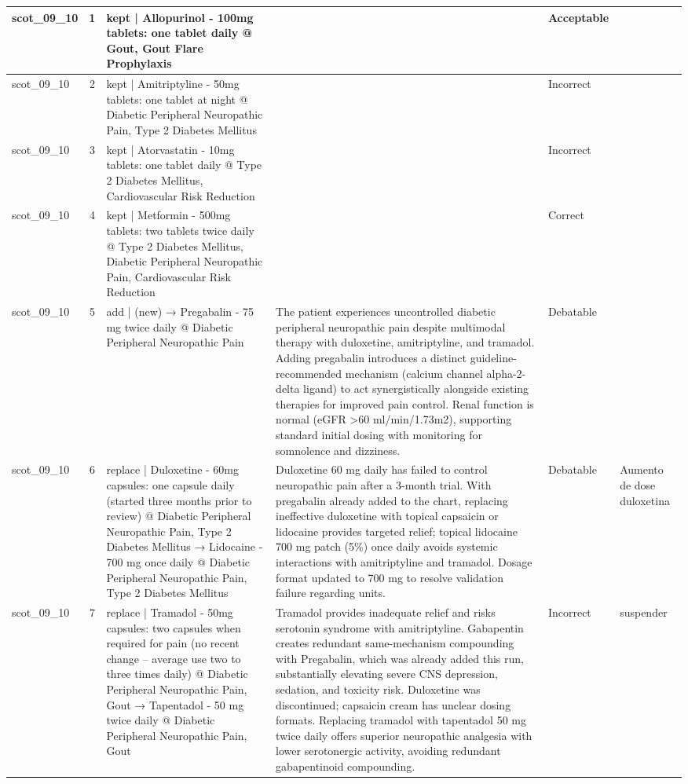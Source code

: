 \begin{longtable}{|p{1.45cm}|c|p{3.3cm}|p{6.5cm}|p{1.55cm}|p{2.3cm}|}
\hline
scot\_09\_10 & 1 & kept | Allopurinol - 100mg tablets: one tablet daily @ Gout, Gout Flare Prophylaxis &  & Acceptable &  \\
\hline
scot\_09\_10 & 2 & kept | Amitriptyline - 50mg tablets: one tablet at night @ Diabetic Peripheral Neuropathic Pain, Type 2 Diabetes Mellitus &  & Incorrect &  \\
\hline
scot\_09\_10 & 3 & kept | Atorvastatin - 10mg tablets: one tablet daily @ Type 2 Diabetes Mellitus, Cardiovascular Risk Reduction &  & Incorrect &  \\
\hline
scot\_09\_10 & 4 & kept | Metformin - 500mg tablets: two tablets twice daily @ Type 2 Diabetes Mellitus, Diabetic Peripheral Neuropathic Pain, Cardiovascular Risk Reduction &  & Correct &  \\
\hline
scot\_09\_10 & 5 & add | (new) → Pregabalin - 75 mg twice daily @ Diabetic Peripheral Neuropathic Pain & The patient experiences uncontrolled diabetic peripheral neuropathic pain despite multimodal therapy with duloxetine, amitriptyline, and tramadol. Adding pregabalin introduces a distinct guideline-recommended mechanism (calcium channel alpha-2-delta ligand) to act synergistically alongside existing therapies for improved pain control. Renal function is normal (eGFR >60 ml/min/1.73m2), supporting standard initial dosing with monitoring for somnolence and dizziness. & Debatable &  \\
\hline
scot\_09\_10 & 6 & replace | Duloxetine - 60mg capsules: one capsule daily (started three months prior to review) @ Diabetic Peripheral Neuropathic Pain, Type 2 Diabetes Mellitus → Lidocaine - 700 mg once daily @ Diabetic Peripheral Neuropathic Pain, Type 2 Diabetes Mellitus & Duloxetine 60 mg daily has failed to control neuropathic pain after a 3-month trial. With pregabalin already added to the chart, replacing ineffective duloxetine with topical capsaicin or lidocaine provides targeted relief; topical lidocaine 700 mg patch (5\%) once daily avoids systemic interactions with amitriptyline and tramadol. Dosage format updated to 700 mg to resolve validation failure regarding units. & Debatable & Aumento de dose duloxetina \\
\hline
scot\_09\_10 & 7 & replace | Tramadol - 50mg capsules: two capsules when required for pain (no recent change – average use two to three times daily) @ Diabetic Peripheral Neuropathic Pain, Gout → Tapentadol - 50 mg twice daily @ Diabetic Peripheral Neuropathic Pain, Gout & Tramadol provides inadequate relief and risks serotonin syndrome with amitriptyline. Gabapentin creates redundant same-mechanism compounding with Pregabalin, which was already added this run, substantially elevating severe CNS depression, sedation, and toxicity risk. Duloxetine was discontinued; capsaicin cream has unclear dosing formats. Replacing tramadol with tapentadol 50 mg twice daily offers superior neuropathic analgesia with lower serotonergic activity, avoiding redundant gabapentinoid compounding. & Incorrect & suspender \\

\end{longtable}
